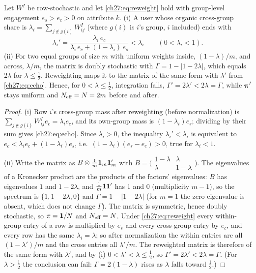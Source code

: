 \documentclass[../structural_economics_book.tex]{subfiles}
\begin{document}
\begin{proposition}\label{ch27:thm:echo}
Let $W^I$ be row-stochastic and let \eqref{ch27:eq:reweight} hold with group-level engagement $e_s > e_c > 0$ on attribute $k$. (i) A user whose organic cross-group share is $\lambda_i = \sum_{j \notin g(i)} W^I_{ij}$ (where $g(i)$ is $i$'s group, $i$ included) ends with
\begin{equation}\label{ch27:eq:echo}
\lambda_i' = \frac{\lambda_i\, e_c}{\lambda_i\, e_c + (1 - \lambda_i)\, e_s} < \lambda_i \qquad (0 < \lambda_i < 1).
\end{equation}
(ii) For two equal groups of size $m$ with uniform weights inside, $(1-\lambda)/m$, and across, $\lambda/m$, the matrix is doubly stochastic with $\Gamma = 1 - |1 - 2\lambda|$, which equals $2\lambda$ for $\lambda \le \tfrac12$. Reweighting maps it to the matrix of the same form with $\lambda'$ from \eqref{ch27:eq:echo}. Hence, for $0 < \lambda \le \tfrac12$, integration falls, $\Gamma' = 2\lambda' < 2\lambda = \Gamma$, while $\boldsymbol{\pi}^I$ stays uniform and $N_{\text{eff}} = N = 2m$ before and after.
\end{proposition}
\begin{proof}
(i) Row $i$'s cross-group mass after reweighting (before normalization) is $\sum_{j\notin g(i)}W^I_{ij}e_c = \lambda_i e_c$, and its own-group mass is $(1-\lambda_i)e_s$; dividing by their sum gives \eqref{ch27:eq:echo}. Since $\lambda_i > 0$, the inequality $\lambda_i' < \lambda_i$ is equivalent to $e_c < \lambda_i e_c + (1-\lambda_i)e_s$, i.e.\ $(1-\lambda_i)(e_s - e_c) > 0$, true for $\lambda_i < 1$.

(ii) Write the matrix as $B \otimes \tfrac1m\mathbf{1}_m\mathbf{1}_m'$ with $B = \bigl(\begin{smallmatrix}1-\lambda & \lambda\\ \lambda & 1-\lambda\end{smallmatrix}\bigr)$. The eigenvalues of a Kronecker product are the products of the factors' eigenvalues: $B$ has eigenvalues $1$ and $1-2\lambda$, and $\tfrac1m\mathbf{1}\mathbf{1}'$ has $1$ and $0$ (multiplicity $m-1$), so the spectrum is $\{1, 1-2\lambda, 0\}$ and $\Gamma = 1-|1-2\lambda|$ (for $m = 1$ the zero eigenvalue is absent, which does not change $\Gamma$). The matrix is symmetric, hence doubly stochastic, so $\pi = \mathbf{1}/N$ and $N_{\text{eff}} = N$. Under \eqref{ch27:eq:reweight} every within-group entry of a row is multiplied by $e_s$ and every cross-group entry by $e_c$, and every row has the same $\lambda_i = \lambda$; so after normalization the within entries are all $(1-\lambda')/m$ and the cross entries all $\lambda'/m$. The reweighted matrix is therefore of the same form with $\lambda'$, and by (i) $0 < \lambda' < \lambda \le \tfrac12$, so $\Gamma' = 2\lambda' < 2\lambda = \Gamma$. (For $\lambda > \tfrac12$ the conclusion can fail: $\Gamma = 2(1-\lambda)$ rises as $\lambda$ falls toward $\tfrac12$.)
\end{proof}
\end{document}

